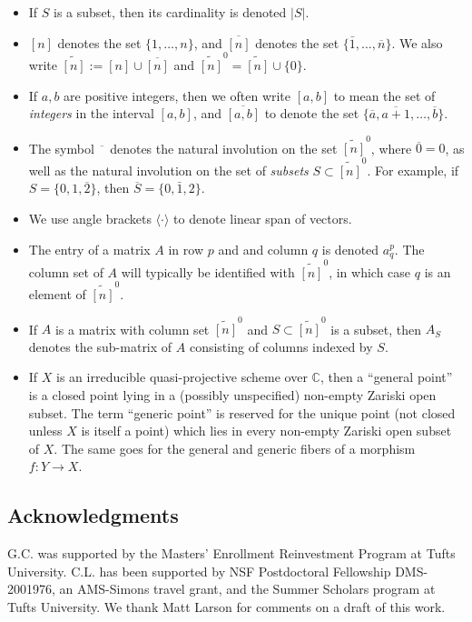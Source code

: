 \documentclass[12pt]{amsart}
\newcommand{\bC}{\mathbb{C}}
\newcommand{\wtn}{\widetilde{[n]}}
\newcommand{\barn}{\overline{n}}
\begin{document}
\begin{itemize}

\item If $S$ is a subset, then its cardinality is denoted $|S|$.
\item $[n]$ denotes the set $\{1,\ldots,n\}$, and $\overline{[n]}$ denotes the set $\{\bar1,\ldots,\barn\}$. We also write $\wtn:=[n]\cup\overline{[n]}$ and $\wtn^0=\wtn\cup\{0\}$.
\item If $a,b$ are positive integers, then we often write $[a,b]$ to mean the set of \emph{integers} in the interval $[a,b]$, and $\overline{[a,b]}$ to denote the set $\{\overline{a},\overline{a+1},\ldots,\overline{b}\}$.
\item The symbol $\overline{\phantom{x}}$ denotes the natural involution on the set $\wtn^0$, where $\overline{0}=0$, as well as the natural involution on the set of \emph{subsets} $S\subset \wtn^0$. For example, if $S=\{0,1,\overline{2}\}$, then $\overline{S}=\{0,\bar1,2\}$.
\item We use angle brackets $\langle\cdot\rangle$ to denote linear span of vectors.
\item The entry of a matrix $A$ in row $p$ and and column $q$ is denoted $a^p_q$. The column set of $A$ will typically be identified with $\wtn^0$, in which case $q$ is an element of $\wtn^0$.
\item If $A$ is a matrix with column set $\wtn^0$ and $S\subset\wtn^0$ is a subset, then $A_S$ denotes the sub-matrix of $A$ consisting of columns indexed by $S$.
\item If $X$ is an irreducible quasi-projective scheme over $\bC$, then a ``general point'' is a closed point lying in a (possibly unspecified) non-empty Zariski open subset. The term ``generic point'' is reserved for the unique point (not closed unless $X$ is itself a point) which lies in every non-empty Zariski open subset of $X$. The same goes for the general and generic fibers of a morphism $f:Y\to X$.
\end{itemize}

\subsection{Acknowledgments}

G.C. was supported by the Masters' Enrollment Reinvestment Program at Tufts University. C.L. has been supported by NSF Postdoctoral Fellowship DMS-2001976, an AMS-Simons travel grant, and the Summer Scholars program at Tufts University. We thank Matt Larson for comments on a draft of this work.
\end{document}
